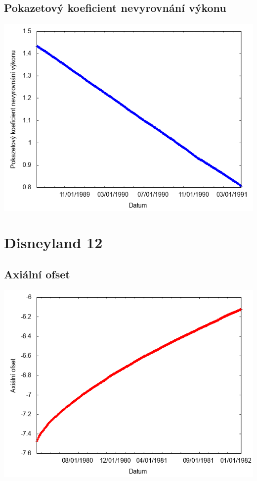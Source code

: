 \documentclass[a4paper,twoside,11pt]{article}
\begin{document}
\subsection*{Pokazetový koeficient nevyrovnání výkonu}
\begin{center}
\includegraphics[width=.8\textwidth]{graphs/Disneyland_11_fha.png}
\end{center}

\newpage
\section*{Disneyland 12}
\subsection*{Axiální ofset}
\begin{center}
\includegraphics[width=.8\textwidth]{graphs/Disneyland_12_ao.png}
\end{center}
\end{document}

